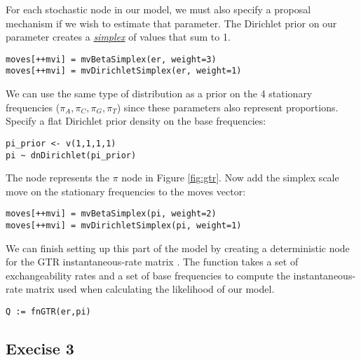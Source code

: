For each stochastic node in our model, we must also specify a proposal mechanism if we wish to estimate that parameter. 
The Dirichlet prior on our parameter  creates a \href{http://en.wikipedia.org/wiki/Simplex}{\textit{simplex}} of values that sum to 1. 

{\tt\small \begin{snugshade*}
\begin{lstlisting}
moves[++mvi] = mvBetaSimplex(er, weight=3)
moves[++mvi] = mvDirichletSimplex(er, weight=1)
\end{lstlisting}
\end{snugshade*}}

We can use the same type of distribution as a prior on the 4 stationary frequencies ($\pi_A, \pi_C, \pi_G, \pi_T$) since these parameters also represent proportions. 
Specify a flat Dirichlet prior density on the base frequencies:
{\tt \begin{snugshade*}
\begin{lstlisting}
pi_prior <- v(1,1,1,1) 
pi ~ dnDirichlet(pi_prior)
\end{lstlisting}
\end{snugshade*}}

The node  represents the $\pi$ node in Figure \ref{fig:gtr}.
Now add the simplex scale move on the stationary frequencies to the moves vector:
{\tt \small \begin{snugshade*}
\begin{lstlisting}
moves[++mvi] = mvBetaSimplex(pi, weight=2)
moves[++mvi] = mvDirichletSimplex(pi, weight=1)
\end{lstlisting}
\end{snugshade*}}

We can finish setting up this part of the model by creating a deterministic node for the GTR instantaneous-rate matrix . 
The  function takes a set of exchangeability rates and a set of base frequencies to compute the instantaneous-rate matrix used when calculating the likelihood of our model.
{\tt \begin{snugshade*}
\begin{lstlisting}
Q := fnGTR(er,pi)
\end{lstlisting}
\end{snugshade*}}




\subsection{Execise 3}

